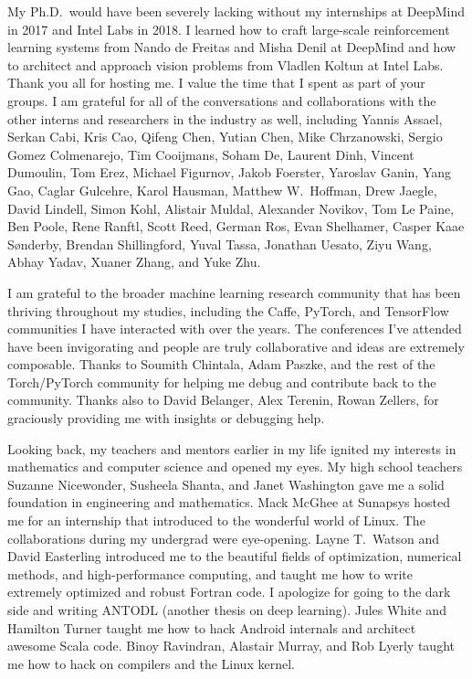 \documentclass[12pt]{cmuthesis}
\begin{document}
\begin{acknowledgments}
  My Ph.D.~would have been severely lacking without my internships
  at DeepMind in 2017 and Intel Labs in 2018.
  I learned how to craft large-scale reinforcement learning systems
  from Nando de Freitas and Misha Denil at DeepMind and
  how to architect and approach vision problems from
  Vladlen Koltun at Intel Labs.
  Thank you all for hosting me.
  I value the time that I spent as part of your groups.
  I am grateful for all of the conversations and collaborations
  with the other interns and researchers in the industry as well,
  including
  Yannis Assael,
  Serkan Cabi,
  Kris Cao,
  Qifeng Chen,
  Yutian Chen,
  Mike Chrzanowski,
  Sergio Gomez Colmenarejo,
  Tim Cooijmans,
  Soham De,
  Laurent Dinh,
  Vincent Dumoulin,
  Tom Erez,
  Michael Figurnov,
  Jakob Foerster,
  Yaroslav Ganin,
  Yang Gao,
  Caglar Gulcehre,
  Karol Hausman,
  Matthew W.~Hoffman,
  Drew Jaegle,
  David Lindell,
  Simon Kohl,
  Alistair Muldal,
  Alexander Novikov,
  Tom Le Paine,
  Ben Poole,
  Rene Ranftl,
  Scott Reed,
  German Ros,
  Evan Shelhamer,
  Casper Kaae Sønderby,
  Brendan Shillingford,
  Yuval Tassa,
  Jonathan Uesato,
  Ziyu Wang,
  Abhay Yadav,
  Xuaner Zhang, and
  Yuke Zhu.

  I am grateful to the broader machine learning research community that
  has been thriving throughout my studies, including the
  Caffe, PyTorch, and TensorFlow communities I have interacted
  with over the years.
  The conferences I've attended have been invigorating and
  people are truly collaborative and ideas are
  extremely composable.
  Thanks to Soumith Chintala, Adam Paszke, and the rest of the
  Torch/PyTorch community for helping me debug and contribute
  back to the community.
  Thanks also to
  David Belanger,
  Alex Terenin,
  Rowan Zellers,
  for graciously providing me with insights or
  debugging help.

  Looking back, my teachers and mentors earlier in my life
  ignited my interests in mathematics and computer science
  and opened my eyes.
  My high school teachers
  Suzanne Nicewonder,
  Susheela Shanta, and
  Janet Washington gave me a solid foundation
  in engineering and mathematics.
  Mack McGhee at Sunapsys hosted me for an
  internship that introduced to the wonderful
  world of Linux.
  The collaborations during my undergrad were eye-opening.
  Layne T.~Watson and David Easterling
  introduced me to the beautiful fields
  of optimization, numerical methods, and
  high-performance computing, and taught me how to
  write extremely optimized and robust Fortran code.
  I apologize for going to the dark side and writing
  ANTODL (another thesis on deep learning).
  Jules White and Hamilton Turner taught me how
  to hack Android internals and architect awesome Scala code.
  Binoy Ravindran, Alastair Murray, and Rob Lyerly
  taught me how to hack on compilers
  and the Linux kernel.


\end{acknowledgments}
\end{document}
